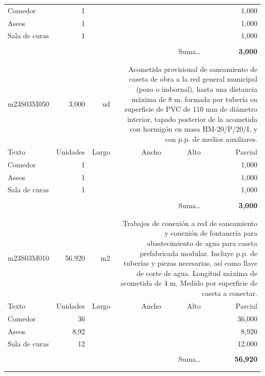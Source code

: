\documentclass{book}%
\begin{document}
\begin{longtable}{lrrrrr}
\hline%
\multicolumn{1}{p{3.5cm}}{Comedor}&1&&&&     1,000\\%
\multicolumn{1}{p{3.5cm}}{Aseos}&1&&&&     1,000\\%
\multicolumn{1}{p{3.5cm}}{Sala de curas}&1&&&&     1,000\\%
&&&&&\\%
\multicolumn{5}{r}{Suma\ldots}&\textbf{     3,000}\\%
\hline%
&&&&&\\%
&&&&&\\%
m23S03M050&     3,000& ud&\multicolumn{3}{p{6cm}}{\scriptsize Acometida provisional de saneamiento de caseta de obra a la red general municipal (pozo o imbornal), hasta una distancia máxima de 8 m, formada por tubería en superficie de PVC de 110 mm de diámetro interior, tapado posterior de la acometida con hormigón en masa HM-20/P/20/I, y con p.p. de medios auxiliares.\normalsize}\\%
Texto&Unidades&Largo&Ancho&Alto&Parcial\\%
\hline%
\multicolumn{1}{p{3.5cm}}{Comedor}&1&&&&     1,000\\%
\multicolumn{1}{p{3.5cm}}{Aseos}&1&&&&     1,000\\%
\multicolumn{1}{p{3.5cm}}{Sala de curas}&1&&&&     1,000\\%
&&&&&\\%
\multicolumn{5}{r}{Suma\ldots}&\textbf{     3,000}\\%
\hline%
&&&&&\\%
&&&&&\\%
m23S03M010&    56,920& m2&\multicolumn{3}{p{6cm}}{\scriptsize Trabajos de conexión a red de saneamiento y conexión de fontanería para abastecimiento de agua para caseta prefabricada modular. Incluye p.p. de tuberías y piezas necesarias, así como llave de corte de agua. Longitud máxima de acometida de 4 m. Medido por superficie de caseta a conectar.\normalsize}\\%
Texto&Unidades&Largo&Ancho&Alto&Parcial\\%
\hline%
\multicolumn{1}{p{3.5cm}}{Comedor}&36&&&&    36,000\\%
\multicolumn{1}{p{3.5cm}}{Aseos}&8,92&&&&     8,920\\%
\multicolumn{1}{p{3.5cm}}{Sala de curas}&12&&&&    12,000\\%
&&&&&\\%
\multicolumn{5}{r}{Suma\ldots}&\textbf{    56,920}\\%
\hline%
&&&&&\\%
&&&&&\\%

\end{longtable}
\end{document}
